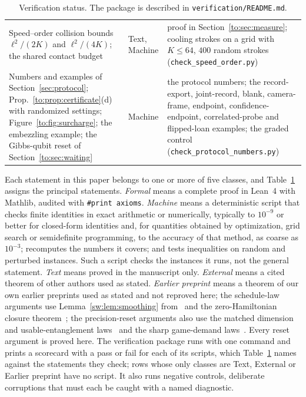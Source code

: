 \begin{table}[tp]
\begin{tabular}{@{}>{\raggedright\arraybackslash}p{5.6cm}>{\raggedright\arraybackslash}p{2.4cm}>{\raggedright\arraybackslash}p{7.6cm}@{}}
Speed--order collision bounds $\ell^2/(2K)$ and $\ell^2/(4K)$; the shared contact budget & Text, Machine & proof in Section~\ref{to:sec:measure}; cooling strokes on a grid with $K\le64$, $400$ random strokes (\texttt{check\_speed\_order.py})\\
Numbers and examples of Section~\ref{sec:protocol}; Prop.~\ref{to:prop:certificate}(d) with randomized settings; Figure~\ref{to:fig:surcharge}; the embezzling example; the Gibbs-qubit reset of Section~\ref{to:sec:waiting} & Machine & the protocol numbers; the record-export, joint-record, blank, camera-frame, endpoint, confidence-endpoint, correlated-probe and flipped-loan examples; the graded control (\texttt{check\_protocol\_numbers.py})\\
\bottomrule
\end{tabular}
\caption{Verification status. The package is described in \texttt{verification/README.md}.}
\label{tab:verification}
\end{table}

Each statement in this paper belongs to one or more of five classes, and Table~\ref{tab:verification} assigns the principal statements. \emph{Formal} means a complete proof in Lean~4 with Mathlib, audited with \texttt{\#print axioms}. \emph{Machine} means a deterministic script that checks finite identities in exact arithmetic or numerically, typically to $10^{-9}$ or better for closed-form identities and, for quantities obtained by optimization, grid search or semidefinite programming, to the accuracy of that method, as coarse as $10^{-3}$; recomputes the numbers it covers; and tests inequalities on random and perturbed instances. Such a script checks the instances it runs, not the general statement. \emph{Text} means proved in the manuscript only. \emph{External} means a cited theorem of other authors used as stated. \emph{Earlier preprint} means a theorem of our own earlier preprints used as stated and not reproved here; the schedule-law arguments use Lemma~\ref{sw:lem:smoothing} from~\cite{Douglas26closed} and the zero-Hamiltonian closure theorem~\cite[Thm.~3.2(a)]{Memory}; the precision-reset arguments also use the matched dimension and usable-entanglement laws~\cite[Theorem~1.1]{HPuncomputable} and the sharp game-demand laws~\cite[Theorem~11.9 and Corollary~11.11]{HPprecision}. Every reset argument is proved here. The verification package runs with one command and prints a scorecard with a pass or fail for each of its scripts, which Table~\ref{tab:verification} names against the statements they check; rows whose only classes are Text, External or Earlier preprint have no script. It also runs negative controls, deliberate corruptions that must each be caught with a named diagnostic.

